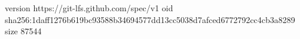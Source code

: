 version https://git-lfs.github.com/spec/v1
oid sha256:1daff1276b619bc93588b34694577dd13cc5038d7afced6772792cc4cb3a8289
size 87544
